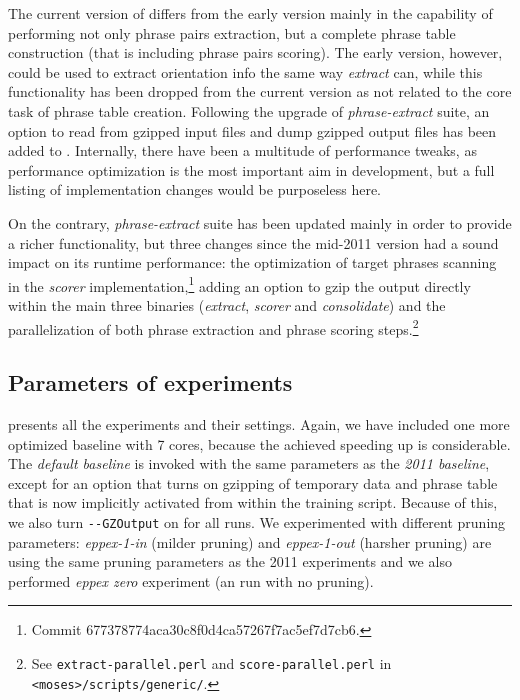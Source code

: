 The current version of \eppex{} differs from the early version mainly in the
capability of performing not only phrase pairs extraction, but a complete
phrase table construction (that is including phrase pairs scoring).
The early version, however, could be used to extract orientation info
the same way \emph{extract} can, while this functionality has been dropped
from the current version as not related to the core task of phrase table creation.
Following the upgrade of \emph{phrase-extract} suite, an option to read from
gzipped input files and dump gzipped output files has been added to \eppex{}.
Internally, there have been a multitude of performance tweaks,
as performance optimization is the most important aim in \eppex{} development,
but a full listing of implementation changes would be purposeless here.

On the contrary, \emph{phrase-extract} suite has been updated mainly in order to
provide a richer functionality, but three changes since the mid-2011 version
had a sound impact on its runtime performance: the optimization of target phrases
scanning in the \emph{scorer} implementation,\footnote{Commit 677378774aca30c8f0d4ca57267f7ac5ef7d7cb6.}
adding an option to gzip the output directly within the main three binaries
(\emph{extract}, \emph{scorer} and \emph{consolidate})
and the parallelization of both phrase extraction and phrase scoring
steps.\footnote{See \texttt{extract-parallel.perl} and \texttt{score-parallel.perl}
in \texttt{<moses>/scripts/generic/}.}

\subsection{Parameters of experiments}

 presents all the experiments and their settings.
Again, we have included one more optimized baseline with 7 cores, because
the achieved speeding up is considerable.
The \emph{default baseline} is invoked with the same parameters as the \emph{2011
baseline}, except for an option that turns on gzipping of temporary data and
phrase table that is now implicitly activated from within the training script.
Because of this, we also turn \verb|--GZOutput| on for all \eppex{} runs.
We experimented with different pruning parameters: \emph{eppex-1-in} (milder
pruning) and \emph{eppex-1-out} (harsher pruning) are using the same pruning
parameters as the 2011 experiments and we also performed \emph{eppex zero}
experiment (an \eppex{} run with no pruning).

